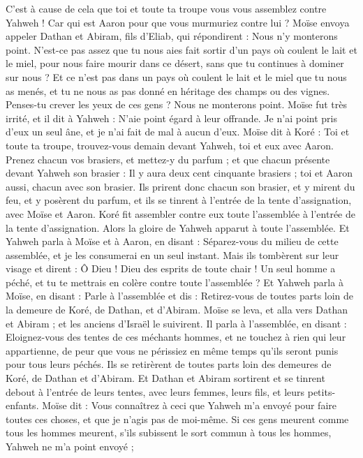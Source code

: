 \begin{multicols}{2}
C'est à cause de cela que toi et toute ta troupe vous vous assemblez contre Yahweh ! Car qui est Aaron pour que vous murmuriez contre lui ?
Moïse envoya appeler Dathan et Abiram, fils d'Eliab, qui répondirent : Nous n’y monterons point.
N’est-ce pas assez que tu nous aies fait sortir d'un pays où coulent le lait et le miel, pour nous faire mourir dans ce désert, sans que tu continues à dominer sur nous ?
Et ce n’est pas dans un pays où coulent le lait et le miel que tu nous as menés, et tu ne nous as pas donné en héritage des champs ou des vignes. Penses-tu crever les yeux de ces gens ? Nous ne monterons point.
Moïse fut très irrité, et il dit à Yahweh : N’aie point égard à leur offrande. Je n'ai point pris d'eux un seul âne, et je n'ai fait de mal à aucun d'eux.
Moïse dit à Koré : Toi et toute ta troupe, trouvez-vous demain devant Yahweh, toi et eux avec Aaron.
Prenez chacun vos brasiers, et mettez-y du parfum ; et que chacun présente devant Yahweh son brasier : Il y aura deux cent cinquante brasiers ; toi et Aaron aussi, chacun avec son brasier.
Ils prirent donc chacun son brasier, et y mirent du feu, et y posèrent du parfum, et ils se tinrent à l'entrée de la tente d'assignation, avec Moïse et Aaron.
Koré fit assembler contre eux toute l'assemblée à l'entrée de la tente d'assignation. Alors la gloire de Yahweh apparut à toute l'assemblée.
Et Yahweh parla à Moïse et à Aaron, en disant :
Séparez-vous du milieu de cette assemblée, et je les consumerai en un seul instant.
Mais ils tombèrent sur leur visage et dirent : Ô Dieu ! Dieu des esprits de toute chair ! Un seul homme a péché, et tu te mettrais en colère contre toute l'assemblée ?
Et Yahweh parla à Moïse, en disant :
Parle à l'assemblée et dis : Retirez-vous de toutes parts loin de la demeure de Koré, de Dathan, et d'Abiram.
Moïse se leva, et alla vers Dathan et Abiram ; et les anciens d'Israël le suivirent.
Il parla à l'assemblée, en disant : Eloignez-vous des tentes de ces méchants hommes, et ne touchez à rien qui leur appartienne, de peur que vous ne périssiez en même temps qu’ils seront punis pour tous leurs péchés.
Ils se retirèrent de toutes parts loin des demeures de Koré, de Dathan et d'Abiram. Et Dathan et Abiram sortirent et se tinrent debout à l'entrée de leurs tentes, avec leurs femmes, leurs fils, et leurs petits-enfants.
Moïse dit : Vous connaîtrez à ceci que Yahweh m'a envoyé pour faire toutes ces choses, et que je n’agis pas de moi-même.
Si ces gens meurent comme tous les hommes meurent, s'ils subissent le sort commun à tous les hommes, Yahweh ne m'a point envoyé ;

\end{multicols}
